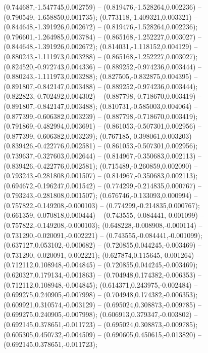  (0.744687,-1.547745,0.002759) -- (0.819476,-1.528264,0.002236) -- (0.790549,-1.658850,0.001735);
 (0.773118,-1.409321,0.003321) -- (0.844648,-1.391926,0.002672) -- (0.819476,-1.528264,0.002236);
 (0.796601,-1.264985,0.003784) -- (0.865168,-1.252227,0.003027) -- (0.844648,-1.391926,0.002672);
 (0.814031,-1.118152,0.004129) -- (0.880243,-1.111973,0.003288) -- (0.865168,-1.252227,0.003027);
 (0.824520,-0.972743,0.004336) -- (0.889252,-0.974236,0.003444) -- (0.880243,-1.111973,0.003288);
 (0.827505,-0.832875,0.004395) -- (0.891807,-0.842147,0.003488) -- (0.889252,-0.974236,0.003444);
 (0.822823,-0.702492,0.004302) -- (0.887798,-0.718670,0.003419) -- (0.891807,-0.842147,0.003488);
 (0.810731,-0.585003,0.004064) -- (0.877399,-0.606382,0.003239) -- (0.887798,-0.718670,0.003419);
 (0.791869,-0.482994,0.003691) -- (0.861053,-0.507301,0.002956) -- (0.877399,-0.606382,0.003239);
 (0.767185,-0.398061,0.003203) -- (0.839426,-0.422776,0.002581) -- (0.861053,-0.507301,0.002956);
 (0.739637,-0.327603,0.002644) -- (0.814967,-0.350683,0.002113) -- (0.839426,-0.422776,0.002581);
 (0.715489,-0.260859,0.002090) -- (0.793243,-0.281808,0.001507) -- (0.814967,-0.350683,0.002113);
 (0.694672,-0.196247,0.001542) -- (0.774299,-0.214835,0.000767) -- (0.793243,-0.281808,0.001507);
 (0.676746,-0.133093,0.000994) -- (0.757822,-0.149208,-0.000103) -- (0.774299,-0.214835,0.000767);
 (0.661359,-0.070818,0.000444) -- (0.743555,-0.084441,-0.001099) -- (0.757822,-0.149208,-0.000103);
 (0.648228,-0.008908,-0.000114) -- (0.731290,-0.020091,-0.002221) -- (0.743555,-0.084441,-0.001099);
 (0.637127,0.053102,-0.000682) -- (0.720855,0.044245,-0.003469) -- (0.731290,-0.020091,-0.002221);
 (0.627874,0.115645,-0.001264) -- (0.712112,0.108948,-0.004845) -- (0.720855,0.044245,-0.003469);
 (0.620327,0.179134,-0.001863) -- (0.704948,0.174382,-0.006353) -- (0.712112,0.108948,-0.004845);
 (0.614371,0.243975,-0.002484) -- (0.699275,0.240905,-0.007998) -- (0.704948,0.174382,-0.006353);
 (0.609921,0.310574,-0.003129) -- (0.695024,0.308873,-0.009785) -- (0.699275,0.240905,-0.007998);
 (0.606913,0.379347,-0.003802) -- (0.692145,0.378651,-0.011723) -- (0.695024,0.308873,-0.009785);
 (0.605305,0.450732,-0.004509) -- (0.690605,0.450615,-0.013820) -- (0.692145,0.378651,-0.011723);
